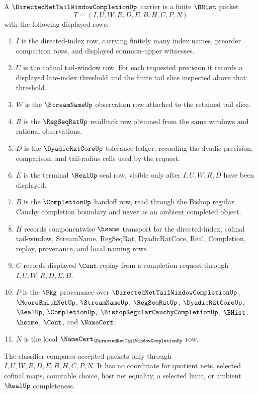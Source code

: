\begin{definition}
\label{def:directed-net-tail-window-completion-carrier}
A $\DirectedNetTailWindowCompletionUp$ carrier is a finite $\BHist$ packet
$$
T=(I,U,W,R,D,E,B,H,C,P,N)
$$
with the following displayed rows:
\begin{enumerate}
\item $I$ is the directed-index row, carrying finitely many index names, preorder comparison rows, and displayed common-upper witnesses.
\item $U$ is the cofinal tail-window row. For each requested precision it records a displayed late-index threshold and the finite tail slice inspected above that threshold.
\item $W$ is the $\StreamNameUp$ observation row attached to the retained tail slice.
\item $R$ is the $\RegSeqRatUp$ readback row obtained from the same windows and rational observations.
\item $D$ is the $\DyadicRatCoreUp$ tolerance ledger, recording the dyadic precision, comparison, and tail-radius cells used by the request.
\item $E$ is the terminal $\RealUp$ seal row, visible only after $I,U,W,R,D$ have been displayed.
\item $B$ is the $\CompletionUp$ handoff row, read through the Bishop regular Cauchy completion boundary and never as an ambient completed object.
\item $H$ records componentwise $\hsame$ transport for the directed-index, cofinal tail-window, StreamName, RegSeqRat, DyadicRatCore, Real, Completion, replay, provenance, and local naming rows.
\item $C$ records displayed $\Cont$ replay from a completion request through $I,U,W,R,D,E,B$.
\item $P$ is the $\Pkg$ provenance over $\DirectedNetTailWindowCompletionUp$, $\MooreSmithNetUp$, $\StreamNameUp$, $\RegSeqRatUp$, $\DyadicRatCoreUp$, $\RealUp$, $\CompletionUp$, $\BishopRegularCauchyCompletionUp$, $\BHist$, $\hsame$, $\Cont$, and $\NameCert$.
\item $N$ is the local $\NameCert_{\DirectedNetTailWindowCompletionUp}$ row.
\end{enumerate}
The classifier compares accepted packets only through $I,U,W,R,D,E,B,H,C,P,N$. It has no coordinate for quotient nets, selected cofinal maps, countable choice, host net equality, a selected limit, or ambient $\RealUp$ completeness.
\end{definition}

